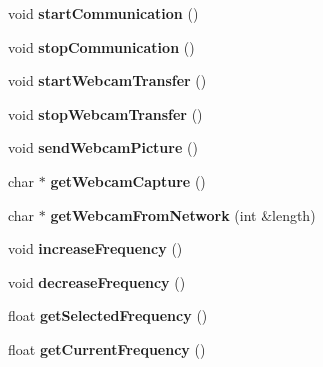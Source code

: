 \begin{DoxyCompactItemize}
\item 
void {\bfseries start\+Communication} ()\hypertarget{classNetClient_addaad6ef20fb50e33e15154e2f969aca}{}\label{classNetClient_addaad6ef20fb50e33e15154e2f969aca}

\item 
void {\bfseries stop\+Communication} ()\hypertarget{classNetClient_a3c4afca49cac638164601d90b052c55d}{}\label{classNetClient_a3c4afca49cac638164601d90b052c55d}

\item 
void {\bfseries start\+Webcam\+Transfer} ()\hypertarget{classNetClient_a1b6ab1640ec8ed589918e251570c93de}{}\label{classNetClient_a1b6ab1640ec8ed589918e251570c93de}

\item 
void {\bfseries stop\+Webcam\+Transfer} ()\hypertarget{classNetClient_a1ccdfdaeebce9ab19fb4b02acd53384f}{}\label{classNetClient_a1ccdfdaeebce9ab19fb4b02acd53384f}

\item 
void {\bfseries send\+Webcam\+Picture} ()\hypertarget{classNetClient_aaac5fa0a6f733fc265fa70ced322707d}{}\label{classNetClient_aaac5fa0a6f733fc265fa70ced322707d}

\item 
char $\ast$ {\bfseries get\+Webcam\+Capture} ()\hypertarget{classNetClient_a1c7d2ea39ff5f72cfc78147271134b15}{}\label{classNetClient_a1c7d2ea39ff5f72cfc78147271134b15}

\item 
char $\ast$ {\bfseries get\+Webcam\+From\+Network} (int \&length)\hypertarget{classNetClient_a94d3e808b6b44fee44a0ddce713667dc}{}\label{classNetClient_a94d3e808b6b44fee44a0ddce713667dc}

\item 
void {\bfseries increase\+Frequency} ()\hypertarget{classNetClient_a909e4576bd89054e6e03b5f13c4f13c7}{}\label{classNetClient_a909e4576bd89054e6e03b5f13c4f13c7}

\item 
void {\bfseries decrease\+Frequency} ()\hypertarget{classNetClient_aba63c5969d16763cb40ed4139e263f24}{}\label{classNetClient_aba63c5969d16763cb40ed4139e263f24}

\item 
float {\bfseries get\+Selected\+Frequency} ()\hypertarget{classNetClient_a288f4009b6afa174c8a8a5cf0aafd1e8}{}\label{classNetClient_a288f4009b6afa174c8a8a5cf0aafd1e8}

\item 
float {\bfseries get\+Current\+Frequency} ()\hypertarget{classNetClient_a2ad0159c2ab52741c14daa41c0fa8918}{}\label{classNetClient_a2ad0159c2ab52741c14daa41c0fa8918}


\end{DoxyCompactItemize}
